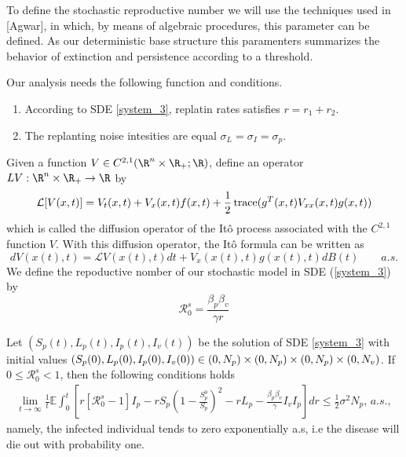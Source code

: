 	To define the stochastic reproductive number we will use the techniques 
used in [Agwar], in which, by means of algebraic procedures, this parameter 
can be defined. As our deterministic base structure this paramenters 
summarizes the behavior of extinction and persistence according to a threshold.

	Our analysis needs the following function and conditions.
\begin{enumerate}[(H-1)]
	\item
	According to SDE \eqref{system_3}, replatin rates satisfies 
	$r=r_1+r_2$. 
	\item
	The replanting noise intesities are equal
	$\sigma_L = \sigma_I = \sigma_p$.
\end{enumerate}
Given a function 
$
	V\in C^{2,1}(\R^n\times\R_{+};\R)
$, 
define an operator 
$
	LV:\R ^ n \times \R_{+}\to\R
$ by
\begin{equation}\label{InfiOpera}
	\mathcal{L}[V(x,t)] = 
		V_t(x,t) + 
		V_x(x,t) f(x,t) + 
		\frac{1}{2} 
		\operatorname{trace}(g^T(x,t)V_{xx}(x,t)g(x,t))
\end{equation}
%
which is called the diffusion operator of the It\^{o} process associated with 
the $C^{2,1}$ function $V$. With this diffusion operator, the It\^{o} formula 
can be written as
\begin{equation}\label{Itoformula}
	dV(x(t),t) = 
		\mathcal{L}
			V(x(t),t)dt + 
			V_x(x(t), t) 
			g(x(t),t) dB(t) \qquad a.s.
\end{equation}
We define the repoductive nomber of our stochastic model in 
SDE (\ref{system_3}) by
\begin{equation}\label{eq5}
	\mathcal{R}_0 ^ s =
		\frac{\beta_p \beta_v}{\gamma r}
\end{equation}
%
\begin{theorem}
	\label{theorem_2}
	Let $(S_p(t),L_p(t),I_p(t),I_v(t))$ 
	be the solution of SDE \eqref{system_3} with initial values 
	$
		(S_p(0),L_p(0),I_p(0),I_v(0)) \in (0,N_p) 
		\times(0, N_p) \times(0,N_p)
		\\
		\times(0, N_v)
	$. 
	If $0\leq \mathcal{R}^s_0<1$, 
	then the following conditions holds
	\begin{align*}
		\lim
		\limits_{t\to \infty}
		\frac{1}{t}
		\mathbb{E}
		\int_{0}^{t}
			\left[
				r
				[\mathcal{R}^s_0 - 1]
				I_p - r S_p
				\left(
					1 - \frac{S^0_p}{S_p}
				\right) ^ 2 - 
				r L_p - 
				\frac{\beta_p\beta_v}{\gamma} 
				I_v I_p
			\right] dr 
			\leq \frac{1}{2} \sigma ^ 2 N_p,\, a.s.,
	\end{align*}
	namely, the infected individual tends to zero exponentially a.s, i.e the 
	disease will die out with probability one.
\end{theorem}
